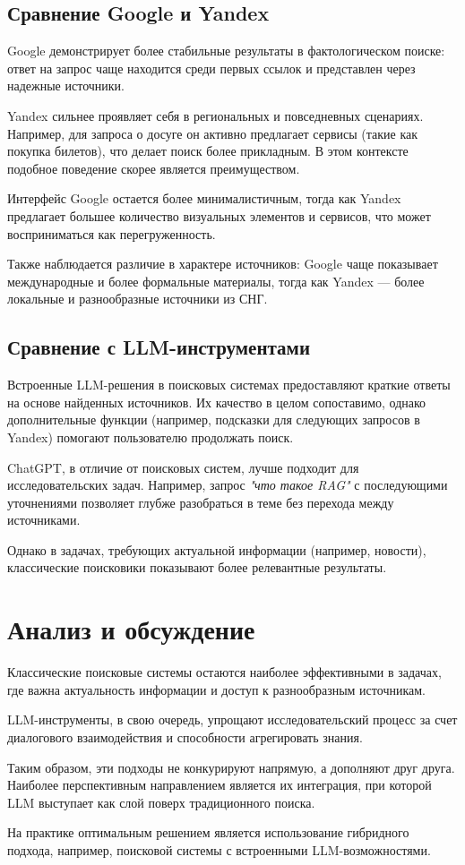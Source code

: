 \documentclass[11pt]{article}
\begin{document}
\subsection{Сравнение Google и Yandex}

Google демонстрирует более стабильные результаты в фактологическом поиске:
ответ на запрос чаще находится среди первых ссылок и представлен через
надежные источники.

Yandex сильнее проявляет себя в региональных и повседневных сценариях.
Например, для запроса о досуге он активно предлагает сервисы (такие как покупка
билетов), что делает поиск более прикладным. В этом контексте подобное поведение
скорее является преимуществом.

Интерфейс Google остается более минималистичным, тогда как Yandex предлагает
большее количество визуальных элементов и сервисов, что может восприниматься
как перегруженность.

Также наблюдается различие в характере источников: Google чаще показывает
международные и более формальные материалы, тогда как Yandex — более
локальные и разнообразные источники из СНГ.

\subsection{Сравнение с LLM-инструментами}

Встроенные LLM-решения в поисковых системах предоставляют краткие ответы
на основе найденных источников. Их качество в целом сопоставимо, однако
дополнительные функции (например, подсказки для следующих запросов в Yandex)
помогают пользователю продолжать поиск.

ChatGPT, в отличие от поисковых систем, лучше подходит для исследовательских
задач. Например, запрос \textit{"что такое RAG"} с последующими уточнениями
позволяет глубже разобраться в теме без перехода между источниками.

Однако в задачах, требующих актуальной информации (например, новости),
классические поисковики показывают более релевантные результаты.

\section{Анализ и обсуждение}

Классические поисковые системы остаются наиболее эффективными в задачах,
где важна актуальность информации и доступ к разнообразным источникам.

LLM-инструменты, в свою очередь, упрощают исследовательский процесс за счет
диалогового взаимодействия и способности агрегировать знания.

Таким образом, эти подходы не конкурируют напрямую, а дополняют друг друга.
Наиболее перспективным направлением является их интеграция, при которой
LLM выступает как слой поверх традиционного поиска.

На практике оптимальным решением является использование гибридного подхода,
например, поисковой системы с встроенными LLM-возможностями.
\end{document}
